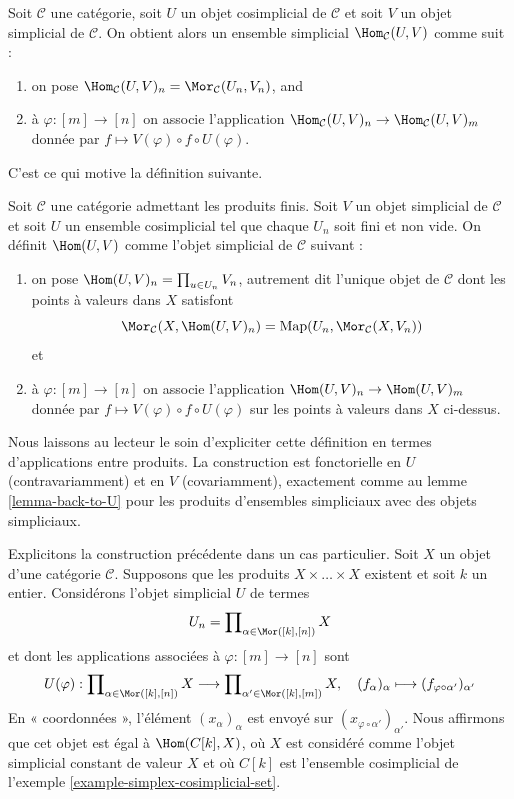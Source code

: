 \noindent
Soit $\mathcal{C}$ une catégorie, soit $U$ un objet cosimplicial de
$\mathcal{C}$ et soit $V$ un objet simplicial de $\mathcal{C}$.
On obtient alors un ensemble simplicial $\Hom_\mathcal{C}(U, V)$
comme suit :
\begin{enumerate}
\item on pose
$\Hom_\mathcal{C}(U, V)_n = \Mor_\mathcal{C}(U_n, V_n)$, and
\item à $\varphi : [m] \to [n]$ on associe l'application
$\Hom_\mathcal{C}(U, V)_n \to \Hom_\mathcal{C}(U, V)_m$
donnée par $f \mapsto V(\varphi) \circ f \circ U(\varphi)$.
\end{enumerate}
C'est ce qui motive la définition suivante.

\begin{definition}
\label{definition-hom-deltak-simplicial}
Soit $\mathcal{C}$ une catégorie admettant les produits finis. Soit $V$
un objet simplicial de $\mathcal{C}$ et soit $U$ un ensemble cosimplicial
tel que chaque $U_n$ soit fini et non vide. On définit
{\it $\Hom(U, V)$} comme l'objet simplicial de $\mathcal{C}$ suivant :
\begin{enumerate}
\item on pose $\Hom(U, V)_n = \prod_{u \in U_n} V_n$, autrement dit
l'unique objet de $\mathcal{C}$ dont les points à valeurs dans $X$
satisfont
$$
\Mor_\mathcal{C}(X, \Hom(U, V)_n)
=
\text{Map}(U_n, \Mor_\mathcal{C}(X, V_n))
$$
et
\item à $\varphi : [m] \to [n]$ on associe l'application
$\Hom(U, V)_n \to \Hom(U, V)_m$
donnée par $f \mapsto V(\varphi) \circ f \circ U(\varphi)$ sur les
points à valeurs dans $X$ ci-dessus.
\end{enumerate}
\end{definition}

\noindent
Nous laissons au lecteur le soin d'expliciter cette définition en termes
d'applications entre produits. La construction est fonctorielle en $U$
(contravariamment) et en $V$ (covariamment), exactement comme au lemme
\ref{lemma-back-to-U} pour les produits d'ensembles simpliciaux avec des
objets simpliciaux.

\medskip\noindent
Explicitons la construction précédente dans un cas particulier. Soit $X$
un objet d'une catégorie $\mathcal{C}$. Supposons que les produits
$X \times \ldots \times X$ existent et soit $k$ un entier. Considérons
l'objet simplicial $U$ de termes
$$
U_n = \prod\nolimits_{\alpha \in \Mor([k], [n])} X
$$
et dont les applications associées à $\varphi : [m] \to [n]$ sont
$$
U(\varphi) :
\prod\nolimits_{\alpha \in \Mor([k], [n])} X
\longrightarrow
\prod\nolimits_{\alpha' \in \Mor([k], [m])} X, \quad
(f_{\alpha})_{\alpha} \longmapsto
(f_{\varphi \circ \alpha'})_{\alpha'}
$$
En « coordonnées », l'élément $(x_\alpha)_\alpha$ est envoyé sur
$(x_{\varphi \circ \alpha'})_{\alpha'}$. Nous affirmons que cet objet
est égal à $\Hom(C[k], X)$, où $X$ est considéré comme l'objet simplicial
constant de valeur $X$ et où $C[k]$ est l'ensemble cosimplicial de
l'exemple \ref{example-simplex-cosimplicial-set}.

